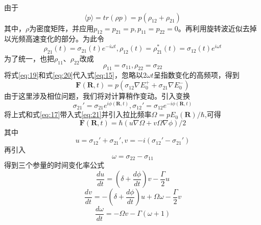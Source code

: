 \documentclass{article}
\begin{document}
	由于
	\begin{equation}
		\langle p \rangle = tr(\rho p) = p(\rho_{12} + \rho_{21}) \label{eq:18}
	\end{equation}
	其中，$\rho$为密度矩阵，并应用$p_{12} = p_{21} = p,p_{11} = p_{22} = 0$。再利用旋转波近似去掉以光频高速变化的部分。为此令
	\begin{equation}
		\rho_{21}(t) = \sigma_{21}(t)e^{-i\omega t}, \rho_{12}(t) = \rho_{21}^*(t) = \sigma_{12}(t)e^{i \omega t} \label{eq:19}
	\end{equation}
	为了统一，也把$\rho_{11}$、$\rho_{22}$改成
	\begin{equation}
		\rho_{11} = \sigma_{11}, \rho_{22} = \sigma_{22} \label{eq:20}
	\end{equation}
	将式\ref{eq:19}和式\ref{eq:20}代入式\ref{eq:15}，忽略以$2\omega t$呈指数变化的高频项，得到
	\begin{equation}
		\boldsymbol{F}(\boldsymbol{R},t) = p(\sigma_{12} \nabla E_0^+ + \sigma_{21} \nabla E_0^-) \label{eq:21}
	\end{equation}
	由于这里涉及相位问题，我们将对计算稍作变动。引入变换
	\begin{equation}
		\sigma_{21}'= \sigma_{21} e^{i\phi(\boldsymbol{R},t)}, \sigma_{12}'= \sigma_{12} e^{-i\phi(\boldsymbol{R},t)} \label{eq:22}
	\end{equation}
	将上式和式\ref{eq:17}带入式\ref{eq:21}并引入拉比频率$\Omega = pE_0(\boldsymbol{R})/\hbar$,可得
	\begin{equation}
		\boldsymbol{F}(\boldsymbol{R},t) = \hbar (u\nabla \Omega + v\Omega \nabla \phi)/2 \label{eq:23}
	\end{equation}
	其中
	\begin{equation}
		u = \sigma_{12}' + \sigma_{21}', v = -i(\sigma_{12}' - \sigma_{21}')
	\end{equation}
	再引入
	\begin{equation}
		\omega = \sigma_{22} - \sigma_{11}
	\end{equation}
	得到三个参量的时间变化率公式
	\begin{equation}
		\frac{du}{dt} = (\delta + \frac{d\phi}{dt})v - \frac{\Gamma}{2}u 
	\end{equation}
	\begin{equation}
		\frac{dv}{dt} = -(\delta + \frac{d\phi}{dt})u + \Omega\omega - \frac{\Gamma}{2}v 
	\end{equation}
	\begin{equation}
		\frac{d\omega}{dt} = - \Omega v - \Gamma(\omega + 1)
	\end{equation}
\end{document}
